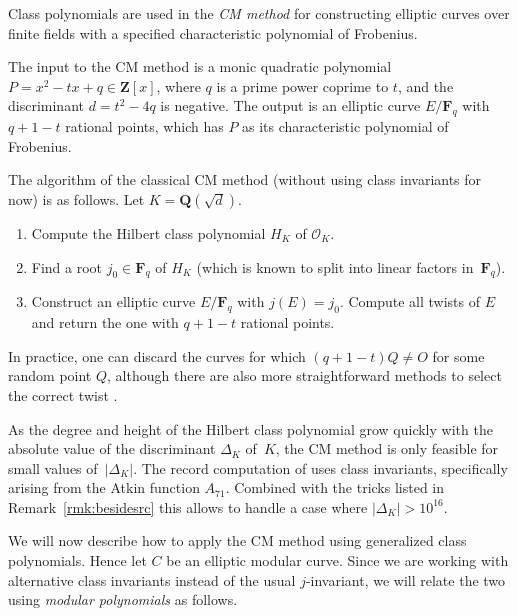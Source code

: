 \documentclass{amsart}
\newcommand{\QQ}{\mathbf{Q}}
\newcommand{\ZZ}{\mathbf{Z}}
\newcommand{\FF}{\mathbf{F}}
\numberwithin{equation}{section}
\theoremstyle{definition}
\begin{document}
Class polynomials are used in the \emph{CM method} for constructing
elliptic curves over finite fields with a specified characteristic polynomial
of Frobenius. 

The input to the CM method is a monic quadratic polynomial $P = x^2 - tx + q\in\ZZ[x]$,
where $q$ is a prime power coprime to $t$, and the discriminant $d=t^2-4q$ is negative.
The output is an elliptic curve $E/\FF_q$ with $q+1-t$ rational points,
which has $P$ as its characteristic polynomial of Frobenius. 

The algorithm of the classical CM method (without using class invariants for now) is as follows. Let $K = \QQ(\sqrt{d})$.
\begin{enumerate}
\item \label{it:computeHCP} Compute the Hilbert class polynomial $H_K$ of $\mathcal{O}_K$.
\item \label{it:findroot}
Find a root $j_0\in\FF_q$ of $H_K$ (which is known to split
into linear factors in~$\FF_q$).
\item \label{it:constructandcheck}
Construct an elliptic curve $E/\FF_q$ with $j(E)=j_0$.
Compute all twists of $E$
and return the one with $q+1-t$ rational points.
\end{enumerate}

In practice, one can discard the curves for which $(q+1-t)Q\not=O$ for some random point $Q$, although there are also more straightforward methods to select the correct twist \cite{rs2010choosing}.

As the degree and height of the Hilbert class polynomial grow quickly with
the absolute value of
the discriminant $\Delta_K$ of~$K$, the CM method is only feasible for small values of~$|\Delta_K|$.
The record computation of \cite{sutherland2012crt} uses class invariants, specifically arising from the Atkin function $A_{71}$.
Combined with the tricks listed in Remark~\ref{rmk:besidesrc} this allows to handle a case where $|\Delta_K| > 10^{16}$.

We will now describe how to apply the CM method using generalized class polynomials.
Hence let $C$ be an elliptic modular curve. Since we are working with alternative class invariants instead of the usual $j$-invariant,
we will relate the two using \emph{modular polynomials}
as follows.
\end{document}
